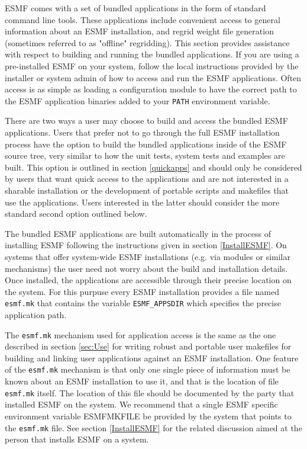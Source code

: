 
ESMF comes with a set of bundled applications in the form of standard command 
line tools. These applications include convenient access to general information 
about an ESMF installation, and regrid weight file generation (sometimes
referred to as "offline" regridding). This section provides assistance with
respect to building and running the bundled applications. If you are using a
pre-installed ESMF on your system, follow the local instructions provided by
the installer or system admin of how to access and run the ESMF applications.
Often access is as simple as loading a configuration module to have the
correct path to the ESMF application binaries added to your {\tt PATH}
environment variable.

There are two ways a user may choose to build and access the bundled ESMF 
applications. Users that prefer not to go through the full ESMF installation 
process have the option to build the bundled applications inside of the ESMF 
source tree, very similar to how the unit tests, system tests and examples are 
built. This option is outlined in section \ref{quickapps} and should only be 
considered by users that want quick access to the applications and are not 
interested in a sharable installation or the development of portable scripts and 
makefiles that use the applications. Users interested in the latter should 
consider the more standard second option outlined below.

The bundled ESMF applications are built automatically in the process of 
installing ESMF following the instructions given in section \ref{InstallESMF}. 
On systems that offer system-wide ESMF installations (e.g. via modules or 
similar mechanisms) the user need not worry about the build and installation 
details. Once installed, the applications are accessible through their precise 
location on the system. For this purpuse every ESMF installation provides a file 
named {\tt esmf.mk} that contains the variable {\tt ESMF\_APPSDIR} which 
specifies the precise application path.

The {\tt esmf.mk} mechanism used for application access is the same as the one 
described in section \ref{sec:Use} for writing robust and portable user 
makefiles for building and linking user applications against an ESMF 
installation. One feature of the {\tt esmf.mk} mechanism is that only one single 
piece of information must be known about an ESMF installation to use it, and 
that is the location of file {\tt esmf.mk} itself. The location of this file 
should be documented by the party that installed ESMF on the system. We 
recommend that a single ESMF specific environment variable ESMFMKFILE be 
provided by the system that points to the {\tt esmf.mk} file. See section 
\ref{InstallESMF} for the related discussion aimed at the person that installs 
ESMF on a system.

